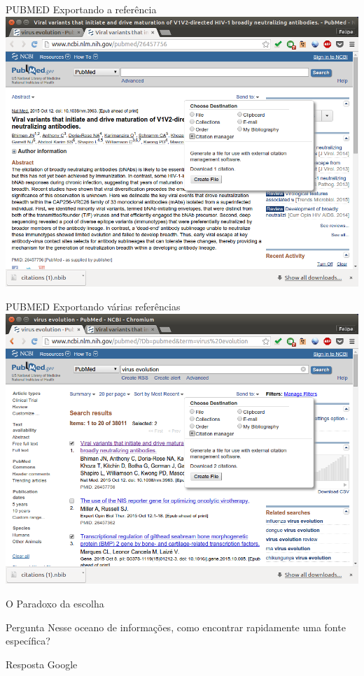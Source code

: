 \documentclass{beamer}
\begin{document}
\begin{frame}{PUBMED Exportando a referência}
  \centering
  \includegraphics[height=.85\textheight]{Busca/pubmed-export1}
\end{frame}

\begin{frame}{PUBMED Exportando várias referências}
  \centering
  \includegraphics[height=.85\textheight]{Busca/pubmed-export2}
\end{frame}

\begin{frame}{O Paradoxo da escolha}
  \begin{block}{Pergunta}
    \footnotesize
    Nesse oceano de informações, como encontrar rapidamente uma fonte
    específica?
  \end{block}
  \pause
  \begin{block}{Resposta}
    Google
  \end{block}
\end{frame}
\end{document}

